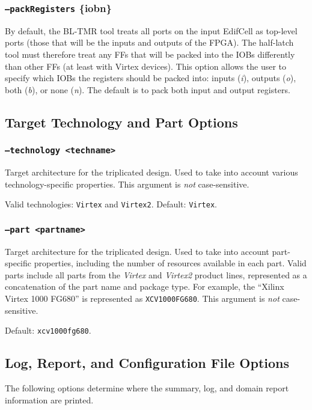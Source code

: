 \documentclass[english]{article}
\begin{document}
\subsubsection{\texttt{--packRegisters} \{i\textbar o\textbar b\textbar n\}}
By default, the BL-TMR tool treats all ports on the input EdifCell as top-level
ports (those that will be the inputs and outputs of the FPGA). The half-latch 
tool must therefore treat any FFs that will be packed into the IOBs differently
than other FFs (at least with Virtex devices). This option allows the user to
specify which IOBs the registers should be packed into: inputs (\emph{i}),
outputs (\emph{o}), both (\emph{b}), or none (\emph{n}). The default is to pack
both input and output registers.

\subsection{Target Technology and Part Options}

\subsubsection{\texttt{--technology <techname>}}
Target architecture for the triplicated design. Used to take into account 
various technology-specific properties. This argument is \emph{not} 
case-sensitive.

Valid technologies: \texttt{Virtex} and \texttt{Virtex2}. Default: 
\texttt{Virtex}.

\subsubsection{\texttt{--part <partname>}}
Target architecture for the triplicated design. Used to take into account 
part-specific properties, including the number of resources available 
in each part. Valid parts include all parts from the \emph{Virtex} and 
\emph{Virtex2} product lines, represented as a concatenation of the part name 
and package type. For example, the ``Xilinx Virtex 1000 FG680'' is represented 
as \texttt{XCV1000FG680}. This argument is \emph{not} case-sensitive.

Default: \texttt{xcv1000fg680}.

\subsection{Log, Report, and Configuration File Options}
The following options determine where the summary, log, and domain report
information are printed.
\end{document}
